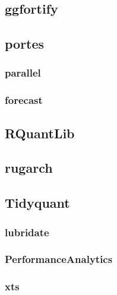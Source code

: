 \documentclass[
  12pt,
  a4paper,
  openany]{book}
\begin{document}
\hypertarget{ggfortify}{%
\subsection{ggfortify}\label{ggfortify}}

\hypertarget{portes}{%
\subsection{portes}\label{portes}}

\hypertarget{parallel}{%
\subsubsection{parallel}\label{parallel}}

\hypertarget{forecast}{%
\subsubsection{forecast}\label{forecast}}

\hypertarget{rquantlib}{%
\subsection{RQuantLib}\label{rquantlib}}

\hypertarget{rugarch}{%
\subsection{rugarch}\label{rugarch}}

\hypertarget{tidyquant}{%
\subsection{Tidyquant}\label{tidyquant}}

\hypertarget{lubridate}{%
\subsubsection{lubridate}\label{lubridate}}

\hypertarget{performanceanalytics}{%
\subsubsection{PerformanceAnalytics}\label{performanceanalytics}}

\hypertarget{xts}{%
\subsubsection{xts}\label{xts}}
\end{document}
